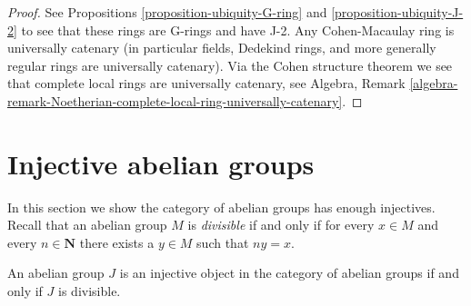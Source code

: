 \begin{proof}
See Propositions \ref{proposition-ubiquity-G-ring} and
\ref{proposition-ubiquity-J-2} to see that these rings are
G-rings and have J-2. Any Cohen-Macaulay ring is universally
catenary (in particular fields, Dedekind rings, and more generally
regular rings are universally catenary). Via the Cohen structure theorem 
we see that complete local rings are universally catenary, see
Algebra, Remark
\ref{algebra-remark-Noetherian-complete-local-ring-universally-catenary}.
\end{proof}








\section{Injective abelian groups}
\label{section-abelian-groups}

\noindent
In this section we show the category of abelian groups has enough
injectives. Recall that an abelian group $M$ is {\it divisible}
if and only if for every $x \in M$ and every $n \in \mathbf{N}$
there exists a $y \in M$ such that $n y = x$.

\begin{lemma}
\label{lemma-injective-abelian}
An abelian group $J$ is an injective object in
the category of abelian groups if and only if $J$
is divisible.
\end{lemma}

